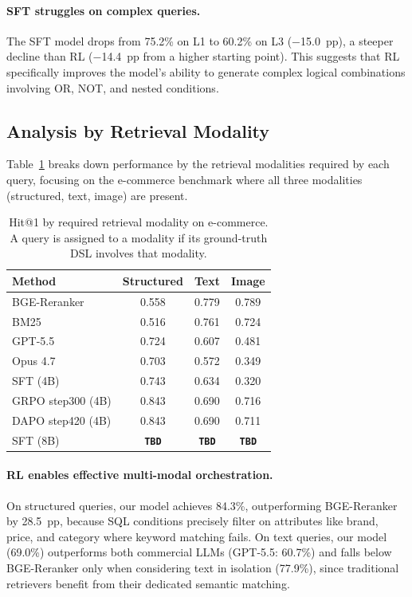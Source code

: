 \documentclass[11pt]{article}
\begin{document}
\paragraph{SFT struggles on complex queries.}
The SFT model drops from 75.2\% on L1 to 60.2\% on L3 ($-$15.0~pp), a steeper decline than RL ($-$14.4~pp from a higher starting point). This suggests that RL specifically improves the model's ability to generate complex logical combinations involving OR, NOT, and nested conditions.


\subsection{Analysis by Retrieval Modality}
\label{sec:modality}

Table~\ref{tab:modality} breaks down performance by the retrieval modalities required by each query, focusing on the e-commerce benchmark where all three modalities (structured, text, image) are present.

\begin{table}[t]
\centering
\small
\caption{Hit@1 by required retrieval modality on e-commerce. A query is assigned to a modality if its ground-truth DSL involves that modality.}
\label{tab:modality}
\begin{tabular}{lccc}
\toprule
\textbf{Method} & \textbf{Structured} & \textbf{Text} & \textbf{Image} \\
\midrule
BGE-Reranker & 0.558 & 0.779 & 0.789 \\
BM25 & 0.516 & 0.761 & 0.724 \\
\midrule
GPT-5.5 & 0.724 & 0.607 & 0.481 \\
Opus 4.7 & 0.703 & 0.572 & 0.349 \\
\midrule
SFT (4B) & 0.743 & 0.634 & 0.320 \\
GRPO step300 (4B) & 0.843 & 0.690 & 0.716 \\
DAPO step420 (4B) & 0.843 & 0.690 & 0.711 \\
SFT (8B) & \textbf{\texttt{TBD}} & \textbf{\texttt{TBD}} & \textbf{\texttt{TBD}} \\
\bottomrule
\end{tabular}
\end{table}

\paragraph{RL enables effective multi-modal orchestration.}
On structured queries, our model achieves 84.3\%, outperforming BGE-Reranker by 28.5~pp, because SQL conditions precisely filter on attributes like brand, price, and category where keyword matching fails.
On text queries, our model (69.0\%) outperforms both commercial LLMs (GPT-5.5: 60.7\%) and falls below BGE-Reranker only when considering text in isolation (77.9\%), since traditional retrievers benefit from their dedicated semantic matching.
\end{document}
